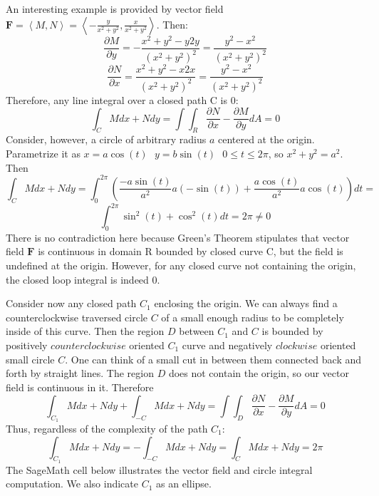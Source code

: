 An interesting example is provided by vector field $\mathbf{F} =\left< M,N \right>=
 \left< -\frac{y}{x^2+y^2},\frac{x}{x^2+y^2}\right>$. Then:
$$\frac{\partial M}{\partial y} = -\frac{x^2+y^2 - y2y}{(x^2+y^2)^2} =\frac{y^2-x^2}{(x^2+y^2)^2} $$
$$\frac{\partial N}{\partial x} = \frac{x^2+y^2 - x2x}{(x^2+y^2)^2} =\frac{y^2-x^2}{(x^2+y^2)^2} $$
Therefore, any line integral over a closed path C is 0:
$$\int_C Mdx + Ndy = \int\int_R \frac{\partial N}{\partial x} - \frac{\partial M}{\partial y}dA = 0$$
Consider, however, a circle of arbitrary radius $a$ centered at the origin.  Parametrize it as $x=a\cos(t) \ \ \
y = b\sin(t) \ \ \ 0\le t\le 2\pi$, so $x^2+y^2=a^2$.   Then
$$\int_C Mdx + Ndy = \int_0^{2\pi} \left( \frac{-a\sin(t)}{a^2}a(-\sin(t)) + \frac{a\cos(t)}{a^2}a\cos(t) \right)dt =  $$
$$\int_0^{2\pi} \sin^2(t) + \cos^2(t) dt = 2\pi \ne 0$$
There is no contradiction here because Green's Theorem stipulates that vector field $\mathbf{F}$ is continuous
in domain R bounded by closed curve C, but the field is undefined at the origin.  However, for any closed curve not
containing the origin, the closed loop integral is indeed 0.

Consider now any closed path $C_1$ enclosing the origin.
We can always find a counterclockwise traversed circle $C$ of a small enough radius to be completely inside of this curve.  Then the region $D$ between $C_1$ and $C$ is bounded by positively \(counterclockwise\) oriented $C_1$ curve and negatively \(clockwise\)
oriented small circle $C$.  One can think of a small cut in between them connected back and forth by straight lines.  The region $D$ does not contain the origin, so our vector field is continuous in it.  Therefore
$$\int_{C_1}Mdx + Ndy+\int_{-C}Mdx + Ndy =  \int\int_D \frac{\partial N}{\partial x} - \frac{\partial M}{\partial y}dA = 0$$
Thus, regardless of the complexity of the path $C_1$:   $$ \int_{C_1} Mdx + Ndy = -\int_{-C}Mdx + Ndy = \int_C Mdx + Ndy= 2\pi$$The SageMath cell below illustrates the vector field and circle integral computation.  We also indicate $C_1$ as an ellipse.

